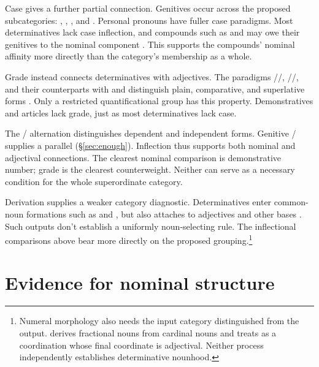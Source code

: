 \documentclass[12pt]{article}
\begin{document}
Case gives a further partial connection. Genitives occur across the proposed subcategories: , , , and . Personal pronouns have fuller case paradigms. Most determinatives lack case inflection, and compounds such as  and  may owe their genitives to the nominal component \citep[423--424, 479--480]{huddleston2002}. This supports the compounds' nominal affinity more directly than the category's membership as a whole.

Grade instead connects determinatives with adjectives. The paradigms /\allowbreak{}/\allowbreak{}, /\allowbreak{}/\allowbreak{}, and their counterparts with  and  distinguish plain, comparative, and superlative forms \citep[391--395]{huddleston2002}. Only a restricted quantificational group has this property. Demonstratives and articles lack grade, just as most determinatives lack case.

The /\allowbreak{} alternation distinguishes dependent and independent forms. Genitive /\allowbreak{} supplies a parallel (§\ref{sec:enough}). Inflection thus supports both nominal and adjectival connections. The clearest nominal comparison is demonstrative number; grade is the clearest counterweight. Neither can serve as a necessary condition for the whole superordinate category.

Derivation supplies a weaker category diagnostic. Determinatives enter common-noun formations such as  and , but  also attaches to adjectives and other bases \citep[Ch.~19, §5.7.2(i)]{huddleston2002}. Such outputs don't establish a uniformly noun-selecting rule. The inflectional comparisons above bear more directly on the proposed grouping.\footnote{Numeral morphology also needs the input category distinguished from the output. \textcite[§§5.4--5.5]{reynolds2026numerals} derives fractional nouns from cardinal nouns and treats  as a coordination whose final coordinate is adjectival. Neither process independently establishes determinative nounhood.}

\section{Evidence for nominal structure}\label{sec:evidence}
\end{document}
